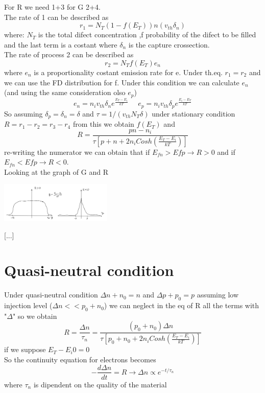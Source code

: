 For R we need 1+3 for G 2+4.\\
The rate of 1 can be described as 
\begin{equation}
r_1=N_T(1-f(E_T))n(v_{th} \delta_n)
\end{equation}
where: $N_T$ is the total difect concentration ,f probability of the difect to be filled and the last term is a costant where $\delta_n$ is the capture crossection.\\
The rate of process 2 can be described as 
\begin{equation}
r_2=N_Tf(E_T)e_n
\end{equation}
where $e_n$ is a proportionality costant emission rate for e.
Under th.eq. $r_1=r_2$ and we can use the FD distribution for f. Under this condition we can calculate $e_n$ (and using the same consideration olso $e_p$)
\begin{equation}
e_n=n_iv_{th}\delta_ne^{\frac{E_T-E_i}{kT}} \ \ \ \ \ \ e_p=n_iv_{th}\delta_pe^{\frac{E_i-E_T}{kT}}
\end{equation}
So assuming $\delta_p=\delta_n=\delta$ and $\tau=1/(v_{th}N_T\delta)$ under stationary condition $R=r_1-r_2=r_3-r_4$ from this we obtain $f(E_T)$ and 
\begin{equation}
R=\frac{pn-n_i}{\tau\left[p+n+2n_iCosh(\frac{E_T-E_i}{kT})\right]}
\end{equation}
re-writing the numerator we can obtain that if $E_{fn}>E{fp}\rightarrow R>0$ and if $E_{fn}<E{fp}\rightarrow R<0$.\\
Looking at the graph of G and R 

\centering
\includegraphics[width=0.4\textwidth]{RG.png}\\
\raggedright

[...]

\section{Quasi-neutral condition}
Under quasi-neutral condition $\Delta n +n_0=n$ and $\Delta p +p_0=p$ assuming low injection level ($\Delta n<<p_0+n_0$) we can neglect in the eq of R all the terms with "$\Delta$" so we obtain
\begin{equation}
R=\frac{\Delta n}{\tau_n}=\frac{(p_0+n_0)\Delta n}{\tau\left[p_0+n_0+2n_iCosh(\frac{E_T-E_i}{kT})\right]}
\end{equation}
if we suppose $E_T-E_i0=0$\\
So the continuity equation for electrons becomes
\begin{equation}
-\frac{d\Delta n}{dt}=R \rightarrow \Delta n \propto e^{-t/\tau_n}
\end{equation} 
where $\tau_n$ is dipendent on the quality of the material

